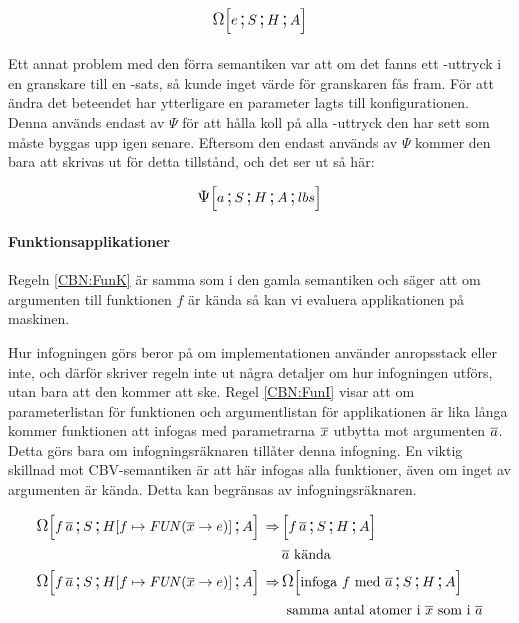 \documentclass[../Optimise]{subfiles}
\begin{document}
\[
\CBNOMEGA SHAe
\]

\paragraph{}

Ett annat problem med den förra semantiken var att om det fanns ett -uttryck
i en granskare till en -sats, så kunde inget värde för granskaren fås fram.
För att ändra det beteendet har ytterligare en parameter lagts till konfigurationen.
Denna används endast av $\Psi$ för att hålla koll på alla -uttryck den har sett
som måste byggas upp igen senare. Eftersom den endast används av $\Psi$ kommer den bara
att skrivas ut för detta tillstånd, och det ser ut så här:

\[
\CBNPSI SHA{lbs}a
\]

\begin{comment}
En annan ändring är att $\Psi$ numera tar en atom istället för en variabel
eftersom det inte bara är variabler som kan vara värden. Detta var en detalj
som missades i CBV-semantiken men som nu har rättats till.
\end{comment}

\paragraph{Funktionsapplikationer}
Regeln \eqref{CBN:FunK} är samma som i den gamla semantiken och säger att om argumenten till funktionen $f$ är kända
så kan vi evaluera applikationen på maskinen. 

Hur infogningen görs beror på om implementationen använder anropsstack eller inte, och därför 
skriver regeln inte ut några detaljer om hur infogningen utförs, utan bara att den kommer att ske. 
Regel \eqref{CBN:FunI} visar att om parameterlistan för funktionen och argumentlistan för applikationen är
lika långa kommer funktionen att infogas med parametrarna $\many{x}$ utbytta mot
argumenten $\many{a}$. Detta görs bara om infogningsräknaren tillåter denna infogning.
En viktig skillnad mot CBV-semantiken är att här infogas alla funktioner, även
om inget av argumenten är kända. Detta kan begränsas av infogningsräknaren.

\begin{align}
\label{CBN:FunK}\CBNOMEGA S{\heap f{\FUN{\many{x}}{e}}}A{f \, \many{a}} \rulesep & \CBNMC {f \, \many{a}}SHA \\
 & \many{a} \text{ kända } \nonumber \\
\label{CBN:FunI}\CBNOMEGA S{\heap f{\FUN{\many{x}}e}}A{f\, \many{a}} \rulesep & \CBNOMEGA SHA{\text{infoga } f \text{ med } \many{a}} \\
 & \text{ samma antal atomer i } \many{x} \text{ som i } \many{a} \nonumber
\end{align}
\end{document}
